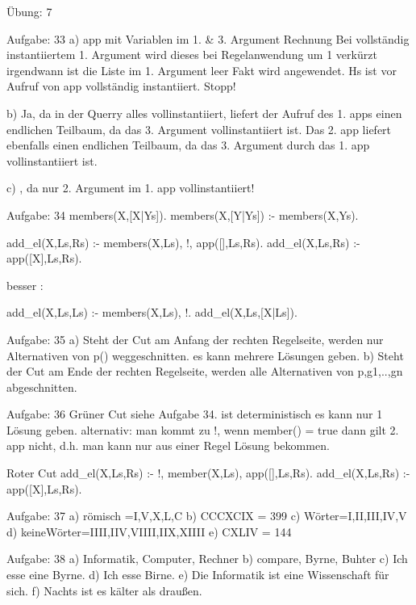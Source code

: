 Übung: 7

Aufgabe: 33
a) app mit Variablen im 1. & 3. Argument \infty Rechnung
Bei vollständig instantiiertem 1. Argument wird dieses bei Regelanwendung um 1 verkürzt \Rightarrow irgendwann ist die Liste im 1. Argument leer \Rightarrow Fakt wird angewendet.
\Rightarrow Hs ist vor Aufruf von app vollständig instantiiert.
\Rightarrow Stopp!

b) Ja, da in der Querry alles vollinstantiiert, liefert der Aufruf des 1. apps einen endlichen Teilbaum, da das 3. Argument vollinstantiiert ist.
Das 2. app liefert ebenfalls einen endlichen Teilbaum, da das 3. Argument durch das 1. app vollinstantiiert ist.

c) \infty , da nur 2. Argument im 1. app vollinstantiiert!


Aufgabe: 34
members(X,[X|Ys]).
members(X,[Y|Ys]) :- members(X,Ys).

add_el(X,Ls,Rs) :- members(X,Ls), !, app([],Ls,Rs).
add_el(X,Ls,Rs) :- app([X],Ls,Rs).

besser :

add_el(X,Ls,Ls) :- members(X,Ls), !.
add_el(X,Ls,[X|Ls]).


Aufgabe: 35
a) Steht der Cut am Anfang der rechten Regelseite, werden nur Alternativen von p() 
	weggeschnitten. \Rightarrow es kann mehrere Lösungen geben.
b) Steht der Cut am Ende der rechten Regelseite, werden alle Alternativen von p,g1,..,gn abgeschnitten.

	
Aufgabe: 36
Grüner Cut siehe Aufgabe 34.
ist deterministisch \Rightarrow es kann nur 1 Lösung geben.
alternativ: man kommt zu !, wenn member() = true \Rightarrow dann gilt 2. app nicht, d.h. man kann nur aus einer Regel Lösung bekommen.

Roter Cut add_el(X,Ls,Rs) :- !, member(X,Ls), app([],Ls,Rs).
		  add_el(X,Ls,Rs) :- app([X],Ls,Rs).

		  
Aufgabe: 37
a) \sum römisch ={I,V,X,L,C}
b) CCCXCIX = 399
c) Wörter={I,II,III,IV,V}
d) keineWörter={IIII,IIV,VIIII,IIX,XIIII}
e) CXLIV = 144


Aufgabe: 38
a) Informatik, Computer, Rechner
b) compare, Byrne, Buhter
c) Ich esse eine Byrne.
d) Ich esse Birne.
e) Die Informatik ist eine Wissenschaft für sich.
f) Nachts ist es kälter als draußen.